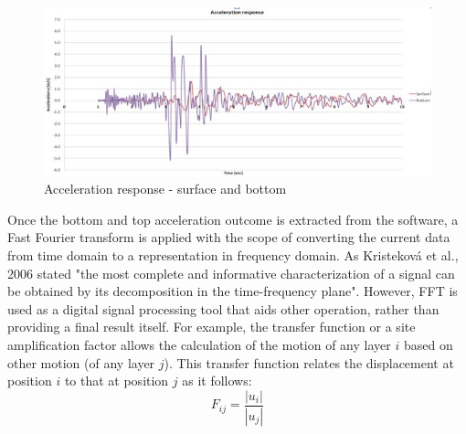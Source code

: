 \documentclass[10pt,a4paper]{report}
\begin{document}
\begin{figure}[h!]
	\centering
	\includegraphics[width=0.7\linewidth]{"acc_response2"}
	\caption{Acceleration response - surface and bottom}
	\label{acc_resp2}
\end{figure}
Once the bottom and top acceleration outcome is extracted from the software, a Fast Fourier transform is applied with the scope of converting the current data from time domain to a representation in frequency domain. As Kristeková et al., 2006 stated "the most complete and informative characterization of a signal can be obtained by its decomposition in the time-frequency plane". However, FFT is used as a digital signal processing tool that aids other operation, rather than providing a final result itself. For example, the transfer function or a site amplification factor allows the calculation of the motion of any layer $i$ based on other motion (of any layer $j$). This transfer function relates the displacement at position $i$ to that at position $j$ as it follows:
\begin{equation}
	F_{ij}=\frac{|u_i|}{|u_j|}
\end{equation}
\end{document}
